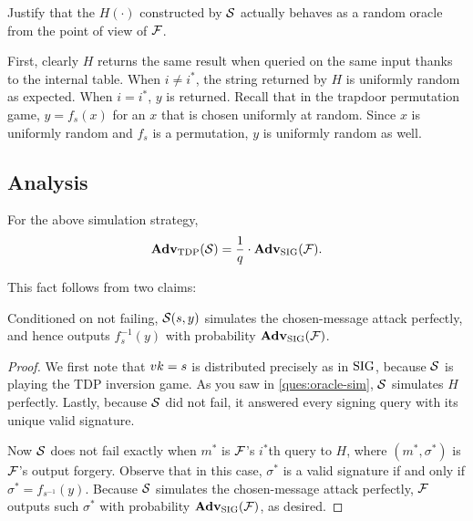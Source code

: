 \documentclass[11pt]{article}
\begin{document}
\begin{question}[ID=oracle-sim]
  Justify that the \(H(\cdot)\) constructed by \(\mathcal{S}\) actually
  behaves as a random oracle from the point of view of \(\mathcal{F}\).
\end{question}
  
\begin{answer}
  First, clearly \(H\) returns the same result when queried on the
  same input thanks to the internal table. When \(i \neq i^*\), the
  string returned by \(H\) is uniformly random as expected. When
  \(i = i^*\), \(y\) is returned. Recall that in the trapdoor
  permutation game, \(y = f_s(x)\) for an \(x\) that is chosen
  uniformly at random. Since \(x\) is uniformly random and \(f_s\) is
  a permutation, \(y\) is uniformly random as well.
\end{answer}

\subsection{Analysis}

\begin{lemma}
  \label{lem:adv-Sim}
  For the above simulation strategy,
  \[ \mathbf{Adv}_{\text{TDP}}(\mathcal{S}) = \frac{1}{q} \cdot \mathbf{Adv}_{\text{SIG}}(\mathcal{F}). \]
\end{lemma}

\noindent This fact follows from two claims:

\begin{claim}
  Conditioned on not failing, $\mathcal{S}(s,y)$ simulates the chosen-message
  attack perfectly, and hence outputs $f_{s}^{-1}(y)$ with probability
  $\mathbf{Adv}_{\text{SIG}}(\mathcal{F})$.
\end{claim}

\begin{proof}
  We first note that $vk=s$ is distributed precisely as in $\text{SIG}$,
  because $\mathcal{S}$ is playing the TDP inversion game.  As you saw in
  \cref{ques:oracle-sim}, $\mathcal{S}$ simulates \(H\) perfectly.  Lastly,
  because $\mathcal{S}$ did not fail, it answered every signing query with
  its unique valid signature.

  Now $\mathcal{S}$ does not fail exactly when $m^{*}$ is $\mathcal{F}$'s $i^{*}$th
  query to $H$, where $(m^{*}, \sigma^{*})$ is $\mathcal{F}$'s output
  forgery.  Observe that in this case, $\sigma^*$ is a valid signature
  if and only if $\sigma^*=f_{s^{-1}}(y)$.  Because $\mathcal{S}$ simulates
  the chosen-message attack perfectly, $\mathcal{F}$ outputs such
  $\sigma^{*}$ with probability $\mathbf{Adv}_{\text{SIG}}(\mathcal{F})$, as desired.
\end{proof}
\end{document}
